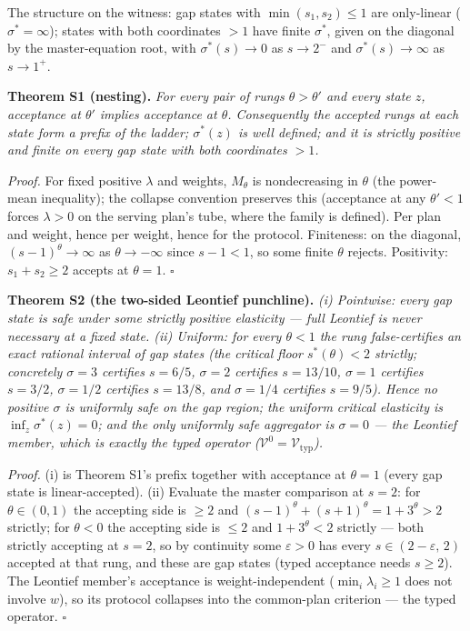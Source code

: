 \documentclass[3p,11pt]{elsarticle}
\begin{document}
The structure on the witness: gap states with \(\min(s_1, s_2) \le 1\)
are only-linear (\(\sigma^* = \infty\)); states with both coordinates
\(> 1\) have finite \(\sigma^*\), given on the diagonal by the
master-equation root, with \(\sigma^*(s) \to 0\) as \(s \to 2^-\)
and \(\sigma^*(s) \to \infty\) as \(s \to 1^+\).

\textbf{Theorem S1 (nesting).} \emph{For every pair of rungs
\(\theta > \theta'\) and every state \(z\), acceptance at
\(\theta'\) implies acceptance at \(\theta\). Consequently the
accepted rungs at each state form a prefix of the ladder;
\(\sigma^*(z)\) is well defined; and it is strictly positive and finite
on every gap state with both coordinates \(> 1\).}

\emph{Proof.} For fixed positive \(\lambda\) and weights,
\(M_\theta\) is nondecreasing in \(\theta\) (the power-mean
inequality); the collapse convention preserves this (acceptance at any
\(\theta' < 1\) forces \(\lambda > 0\) on the serving plan's tube,
where the family is defined). Per plan and weight, hence per weight, hence
for the protocol. Finiteness: on the diagonal, \((s-1)^\theta \to
\infty\) as \(\theta \to -\infty\) since \(s - 1 < 1\), so some
finite \(\theta\) rejects. Positivity: \(s_1 + s_2 \ge 2\) accepts
at \(\theta = 1\). \ensuremath{\square}

\textbf{Theorem S2 (the two-sided Leontief punchline).} \emph{(i)
Pointwise: every gap state is safe under some strictly positive
elasticity --- full Leontief is never necessary at a fixed state. (ii)
Uniform: for every \(\theta < 1\) the rung false-certifies an exact
rational interval of gap states (the critical floor \(s^*(\theta) < 2\)
strictly; concretely \(\sigma = 3\) certifies \(s = 6/5\),
\(\sigma = 2\) certifies \(s = 13/10\), \(\sigma = 1\) certifies
\(s = 3/2\), \(\sigma = 1/2\) certifies \(s = 13/8\), and
\(\sigma = 1/4\) certifies \(s = 9/5\)). Hence no positive
\(\sigma\) is uniformly safe on the gap region; the uniform critical
elasticity is \(\inf_z \sigma^*(z) = 0\); and the only uniformly safe
aggregator is \(\sigma = 0\) --- the Leontief member, which is exactly
the typed operator (\(\mathcal{V}^0 = \mathcal{V}_{\mathrm{typ}}\)).}

\emph{Proof.} (i) is Theorem S1's prefix together with acceptance at
\(\theta = 1\) (every gap state is linear-accepted). (ii) Evaluate the
master comparison at \(s = 2\): for \(\theta \in (0,1)\) the
accepting side is \(\ge 2\) and \((s-1)^\theta + (s+1)^\theta = 1 +
3^\theta > 2\) strictly; for \(\theta < 0\) the accepting side is
\(\le 2\) and \(1 + 3^\theta < 2\) strictly --- both strictly
accepting at \(s = 2\), so by continuity some \(\varepsilon > 0\)
has every \(s \in (2 - \varepsilon,\, 2)\) accepted at that rung, and
these are gap states (typed acceptance needs \(s \ge 2\)). The Leontief
member's acceptance is weight-independent (\(\min_i \lambda_i \ge 1\)
does not involve \(w\)), so its protocol collapses into the common-plan
criterion --- the typed operator. \ensuremath{\square}
\end{document}
